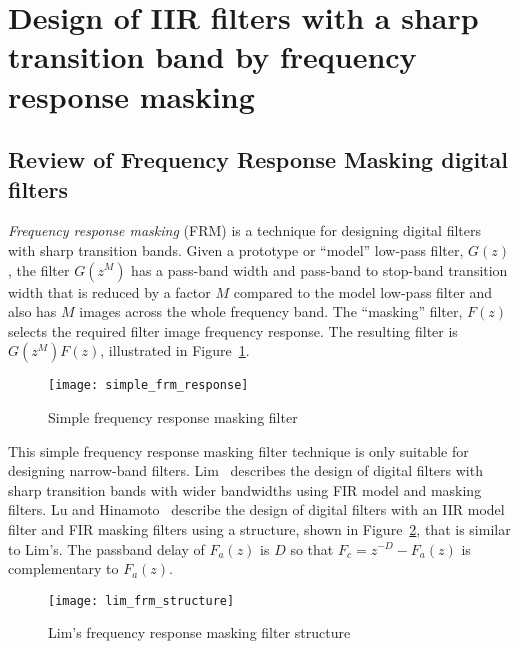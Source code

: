 \documentclass[a4paper,twoside,10pt,english]{report}
\begin{document}
\section{\label{sec:Design-of-an-IIR-filters-with-a-sharp-transition-band-by-frequency-response-masking}Design
  of IIR filters with a sharp transition band by frequency response masking}
\subsection{\label{sec:Review-FRM-digital-filters}Review of Frequency Response Masking digital filters}
\emph{Frequency response masking} (FRM) is a technique for designing digital 
filters with sharp transition bands. Given a prototype or ``model'' low-pass 
filter, $G\left(z\right)$, the filter $G\left(z^M\right)$ has a pass-band width
and pass-band to stop-band transition width that is reduced by a factor $M$
compared to the model low-pass filter and also has $M$ images across the whole
frequency band. The ``masking'' filter, $F\left(z\right)$ selects the required 
filter image frequency response. The resulting filter is 
$G\left(z^M\right)F\left(z\right)$, illustrated in 
Figure~\ref{fig:Simple-frequency-response-masking-filter}.
\begin{figure}[!htbp]
\begin{center}
\texttt{[image: simple\_frm\_response]}
\caption{Simple frequency response masking filter}
\label{fig:Simple-frequency-response-masking-filter}
\end{center}
\end{figure}
This simple frequency response masking filter technique is only suitable for
designing narrow-band filters.
Lim~\cite{Lim_FrequencyResponseMaskingSharpDigitalFilters} describes the design 
of digital filters with sharp transition bands with wider bandwidths using
FIR model and masking filters.
Lu and Hinamoto~\cite{LuHinamoto_IIRFrequencyMaskingFiltersConeProgramming}
describe the design of digital filters with an IIR model filter and FIR masking
filters using a structure, shown in
Figure~\ref{fig:Lims-frequency-response-masking-filter-structure}, that is
similar to Lim's. The passband delay of $F_{a}\left(z\right)$ is $D$ so that
$F_{c}=z^{-D}-F_{a}\left(z\right)$ is complementary to $F_{a}\left(z\right)$.
\begin{figure}[!htbp]
\begin{center}
\texttt{[image: lim\_frm\_structure]}
\caption{Lim's frequency response masking filter structure}
\label{fig:Lims-frequency-response-masking-filter-structure}
\end{center}
\end{figure}
\end{document}
